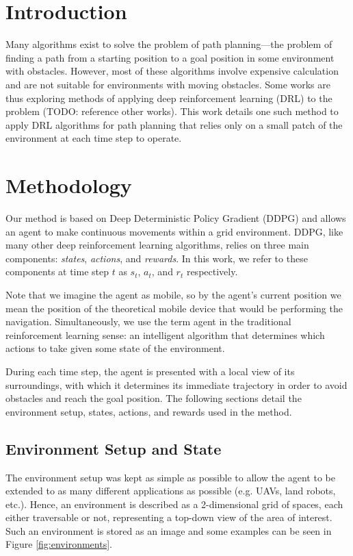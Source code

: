 \section{Introduction}
    Many algorithms exist to solve the problem of path planning—the problem of finding a path
    from a starting position to a goal position in some environment with obstacles. However,
    most of these algorithms involve expensive calculation and are not suitable for environments
    with moving obstacles. Some works are thus exploring methods of applying deep reinforcement
    learning (DRL) to the problem (TODO: reference other works). This work details one such
    method to apply DRL algorithms for path planning that relies only on a small patch of the
    environment at each time step to operate.

\section{Methodology}
    Our method is based on Deep Deterministic Policy Gradient (DDPG)
    \cite{DBLP:journals/corr/LillicrapHPHETS15} and allows an agent to make continuous movements
    within a grid environment. DDPG, like many other deep reinforcement learning algorithms,
    relies on three main components: \textit{states}, \textit{actions}, and \textit{rewards}.
    In this work, we refer to these components at time step $t$ as $s_t$, $a_t$, and $r_t$
    respectively.

    Note that we imagine the agent as mobile, so by the agent's current position we mean the
    position of the theoretical mobile device that would be performing the navigation.
    Simultaneously, we use the term agent in the traditional reinforcement learning sense:
    an intelligent algorithm that determines which actions to take given some state of the
    environment.

    During each time step, the agent is presented with a local view of its surroundings, with
    which it determines its immediate trajectory in order to avoid obstacles and reach the
    goal position. The following sections detail the environment setup, states, actions, and
    rewards used in the method.

    \subsection{Environment Setup and State}\label{sec:env_setup_state}
        The environment setup was kept as simple as possible to allow the agent to be extended
        to as many different applications as possible (e.g. UAVs, land robots, etc.). Hence, an
        environment is described as a 2-dimensional grid of spaces, each either traversable or
        not, representing a top-down view of the area of interest. Such an environment is stored
        as an image and some examples can be seen in Figure \ref{fig:environments}.

